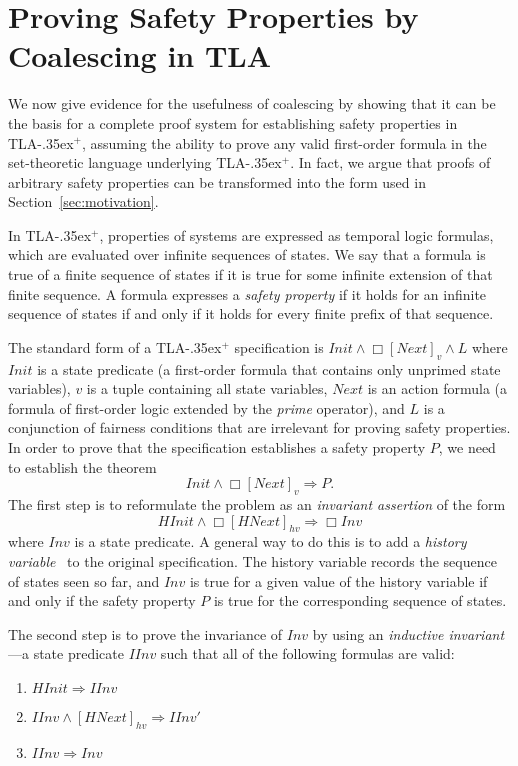 \documentclass{easychair}
\renewcommand{\implies}{\Rightarrow}
\newcommand{\tlaplus}{\mbox{TLA\kern -.35ex$^+$}\xspace}
\newcommand{\edmargin}[2]{\marginpar{\raggedright\footnotesize\color{red}#1: #2}}
\newcommand{\edmargin}[2]{}
\def\smmargin{\edmargin{SM}}
\begin{document}
\section{Proving Safety Properties by Coalescing in TLA}
\label{sec:safety}

We now give evidence for the usefulness of coalescing by showing that it can be
the basis for a complete proof system for establishing safety properties in
\tlaplus, assuming the ability to prove any valid first-order formula in the
set-theoretic language underlying \tlaplus. In fact, we argue that proofs of
arbitrary safety properties can be transformed into the form used in
Section~\ref{sec:motivation}.

In \tlaplus, properties of systems are expressed as temporal logic formulas,
which are evaluated over infinite sequences of states. We say that a formula is
true of a finite sequence of states if it is true for some infinite extension of
that finite sequence. A formula expresses a \emph{safety property} if it holds
for an infinite sequence of states if and only if it holds for every finite
prefix of that sequence.

The standard form of a \tlaplus specification is $Init \land \Box[Next]_v \land
L$ where $Init$ is a state predicate (a first-order formula that contains only
unprimed state variables), $v$ is a tuple containing all state variables, $Next$
  \smmargin{Jul 3: slight rewording}
is an action formula (a formula of first-order logic extended by the \emph{prime}
operator), and $L$ is a conjunction of fairness conditions that are irrelevant
for proving safety properties. In order to prove that the specification
establishes a safety property $P$, we need to establish the theorem
\[
  Init \land \Box[Next]_v \implies P.
\]
%
The first step is to reformulate the problem as an \emph{invariant assertion} of
the form
%
\begin{equation}\label{eq:tla-inv}
  HInit \land \Box[HNext]_{hv} \implies \Box Inv
\end{equation}
%
where $Inv$ is a state predicate. A general way to do this is to add a
\emph{history variable}~\cite{abadi:existence} to the original specification.
The history variable records the sequence of states seen so far, and $Inv$ is
true for a given value of the history variable if and only if the safety
property $P$ is true for the corresponding sequence of states.

\pagebreak %

The second step is to prove the invariance of $Inv$ 
by using an \emph{inductive
  invariant}---a state predicate $IInv$ such that all of the following formulas
are valid:
\begin{enumerate}
\item $HInit \implies IInv$
\item $IInv \land [HNext]_{hv} \implies IInv'$
\item $IInv \implies Inv$
\end{enumerate}
\end{document}
